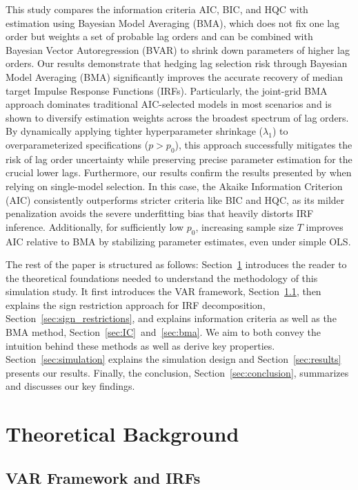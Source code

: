 \documentclass[12pt, a4paper]{article}
\begin{document}
This study compares the information criteria AIC, BIC, and HQC with estimation using Bayesian Model Averaging (BMA), which does not fix one lag order but weights a set of probable lag orders and can be combined with Bayesian Vector Autoregression (BVAR) to shrink down parameters of higher lag orders. Our results demonstrate that hedging lag selection risk through Bayesian Model Averaging (BMA) significantly improves the accurate recovery of median target Impulse Response Functions (IRFs). Particularly, the joint-grid BMA approach dominates traditional AIC-selected models in most scenarios and is shown to diversify estimation weights across the broadest spectrum of lag orders. By dynamically applying tighter hyperparameter shrinkage ($\lambda_1$) to overparameterized specifications ($p>p_0$), this approach successfully mitigates the risk of lag order uncertainty while preserving precise parameter estimation for the crucial lower lags. Furthermore, our results confirm the results presented by \citet{ivanovPractitionersGuideLag2005} when relying on single-model selection. In this case, the Akaike Information Criterion (AIC) consistently outperforms stricter criteria like BIC and HQC, as its milder penalization avoids the severe underfitting bias that heavily distorts IRF inference. Additionally, for sufficiently low $p_{0}$, increasing sample size $T$ improves AIC relative to BMA by stabilizing parameter estimates, even under simple OLS.

The rest of the paper is structured as follows: Section~\ref{sec:theory} introduces the reader to the theoretical foundations needed to understand the methodology of this simulation study. It first introduces the VAR framework, Section~\ref{sec:VAR_IRF}, then explains the sign restriction approach for IRF decomposition, Section~\ref{sec:sign_restrictions}, and explains information criteria as well as the BMA method, Section~\ref{sec:IC}~and~\ref{sec:bma}. We aim to both convey the intuition behind these methods as well as derive key properties. Section~\ref{sec:simulation} explains the simulation design and Section~\ref{sec:results} presents our results. Finally, the conclusion, Section~\ref{sec:conclusion}, summarizes and discusses our key findings.


\section{Theoretical Background}
\label{sec:theory}
 
\subsection{VAR Framework and IRFs}
\label{sec:VAR_IRF}
\end{document}
